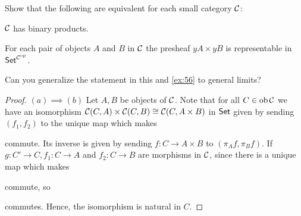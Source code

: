 \begin{exercise}{57}
    Show that the following are equivalent for each small category $\mathcal{C}$:
    \begin{equivalent}
        \item $\mathcal{C}$ has binary products.
        \item For each pair of objects $A$ and $B$ in $\mathcal{C}$ the presheaf $yA\times yB$ is representable in ${\normalfont\mathsf{Set}}^{{\mathcal{C}}^{\text{op}}}$.
    \end{equivalent}
    Can you generalize the statement in this and \ref{ex:56} to general limits?
\end{exercise}
\begin{solution}
    \begin{proof}
        $(a)\implies (b)$ Let $A,B$ be objects of $\mathcal{C}$. Note that for all $C\in\operatorname{ob}\mathcal{C}$ we have an isomorphism $\mathcal{C}(C,A)\times \mathcal{C}(C,B)\cong \mathcal{C}(C, A\times B)$ in $\normalfont\mathsf{Set}$ given by sending $(f_1,f_2)$ to the unique map which makes 
        commute. Its inverse is given by sending $f\colon C\to A\times B$ to $(\pi_A f,\pi_B f)$. 
        If $g\colon C'\to C, f_1\colon C\to A$ and $f_2\colon C\to B$ are morphisms in $\mathcal{C}$, since there is a unique map which makes
        commute, so 
        commutes. Hence, the isomorphism is natural in $C$.


\end{proof}
\end{solution}
